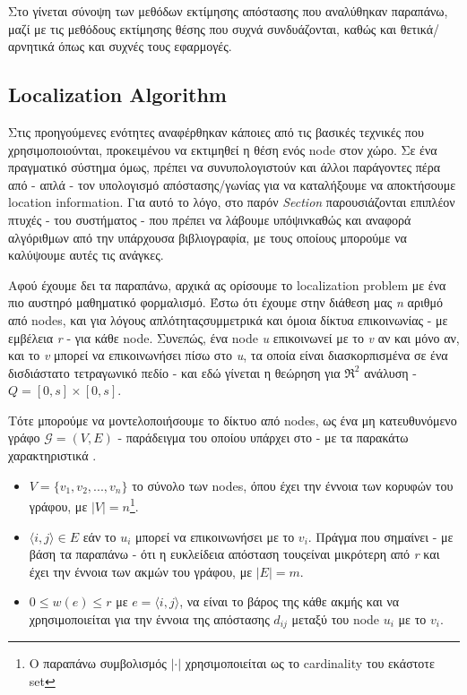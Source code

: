 Στο  γίνεται σύνοψη των μεθόδων εκτίμησης απόστασης
που αναλύθηκαν παραπάνω, μαζί με τις μεθόδους εκτίμησης θέσης που συχνά συνδυάζονται, καθώς και θετικά/αρνητικά όπως και συχνές τους εφαρμογές. 

\subsection{Localization Algorithm} \label{sec:Chapter3-3} 
Στις προηγούμενες ενότητες αναφέρθηκαν κάποιες από τις βασικές τεχνικές που χρησιμοποιούνται, 
προκειμένου να εκτιμηθεί η θέση ενός node στον χώρο. Σε ένα πραγματικό σύστημα όμως, πρέπει να συνυπολογιστούν 
και άλλοι παράγοντες πέρα από - απλά - τον υπολογισμό απόστασης/γωνίας για να καταλήξουμε να αποκτήσουμε location information. 
Για αυτό το λόγο, στο παρόν \emph{Section} παρουσιάζονται επιπλέον πτυχές - του συστήματος - που πρέπει να λάβουμε 
υπόψιν\udot καθώς και αναφορά αλγό\-ρι\-θμων από την υπάρχουσα βιβλιογραφία, με τους οποίους μπορούμε να καλύψουμε αυτές τις
ανάγκες. 

Αφού έχουμε δει τα παραπάνω, αρχικά ας ορίσουμε το localization problem με ένα πιο αυστηρό μαθηματικό φορμαλισμό.
Έστω ότι έχουμε στην διάθεση μας \emph{n} αριθμό από nodes, και για λόγους απλότητας\udot συμμετρικά και όμοια δίκτυα
επικοινωνίας - με εμβέλεια \emph{r} - για κάθε node. Συνεπώς, ένα node \emph{u} επικοινωνεί με το \emph{v} αν και μόνο αν, και το
\emph{v} μπορεί να επικοινωνήσει πίσω στο \emph{u}, τα οποία είναι δια\-σκο\-ρπι\-σμένα σε ένα δισδιάστατο τετραγωνικό
πεδίο - και εδώ γίνεται η θεώρηση για $\mathfrak{R}^2$ ανάλυση - \emph{$Q=[0,s]\times[0,s]$}. 

Τότε μπορούμε να μοντελοποιήσουμε το δίκτυο από nodes, ως ένα μη κατευθυνόμενο γράφο $\mathcal{G} = (V, E)$ - παράδειγμα του οποίου υπάρχει στο  - με τα 
παρακάτω χαρακτηριστικά \cite{wsn-Localization-systems}.  

\begin{itemize}
	\item $V = \{v_1, v_2, ..., v_n\}$ το σύνολο των nodes, όπου έχει την έννοια των κορυφών του γράφου, με $|V| = n$\footnote{Ο 
	παραπάνω συμβολισμός $|\cdot|$ χρησιμοποιείται ως το cardinality του εκάστοτε set}.
	\item $\langle i,j\rangle \in E$ εάν το $u_i$ μπορεί να επικοινωνήσει με το $v_i$. Πράγμα που σημαίνει - με βάση τα παραπάνω - 
	ότι η ευκλείδεια απόσταση τους\udot είναι μικρότερη από \emph{r} και έχει την έννοια των ακμών του γράφου, με $|E| = m$\footnotemark[\value{footnote}].
	\item $0 \le w(e) \le r$ με $e = \langle i,j\rangle$, να είναι το βάρος της κάθε ακμής και να χρησιμοποιείται για την έννοια της απόστασης $d_{ij}$
	μεταξύ του node $u_i$ με το $v_i$.
\end{itemize}

